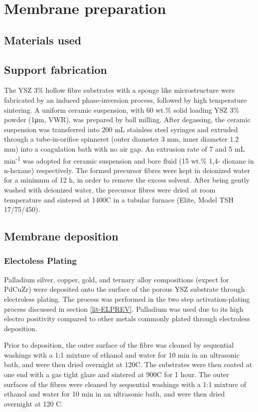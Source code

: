 \section{Membrane preparation}

\subsection{Materials used}
\subsection{Support fabrication}\label{supportmake}
The YSZ 3\% hollow fibre substrates with a sponge like microstructure were fabricated by an induced phase-inversion process, followed by high temperature sintering. A uniform ceramic suspension, with 60 wt.\% solid loading YSZ 3\% powder (1μm, VWR), was prepared by ball milling. After degassing, the ceramic suspension was transferred into 200 mL stainless steel syringes and extruded through a tube-in-orifice spinneret (outer diameter 3 mm, inner diameter 1.2 mm) into a coagulation bath with no air gap. An extrusion rate of 7 and 5 mL min\textsuperscript{-1} was adopted for ceramic suspension and bore fluid (15 wt.\% 1,4- dioxane in n-hexane) respectively. The formed precursor fibres were kept in deionized water for a minimum of 12 h, in order to remove the excess solvent. After being gently washed with deionized water, the precursor fibres were dried at room temperature and sintered at 1400\textdegree C in a tubular furnace (Elite, Model TSH 17/75/450).

\subsection{Membrane deposition}
\subsubsection{Electoless Plating}\label{elpproc}
Palladium silver, copper, gold, and ternary alloy compositions (expect for PdCuZr) were deposited onto the surface of the porous YSZ substrate through electroless plating. The process was performed in the two step activation-plating process discussed in section \ref{lit-ELPREV}. Palladium was used due to its high electro positivity compared to other metals commonly plated through electroless deposition. 

Prior to deposition, the outer surface of the fibre was cleaned by sequential washings with a 1:1 mixture of ethanol and water for 10 min in an ultrasonic bath, and were then dried overnight at 120\textdegree C. The substrates were then coated at one end with a gas tight glaze and sintered at 900\textdegree C for 1 hour. The outer surfaces of the fibres were cleaned by sequential washings with a 1:1 mixture of ethanol and water for 10 min in an ultrasonic bath, and were then dried overnight at 120 \textdegree C.

